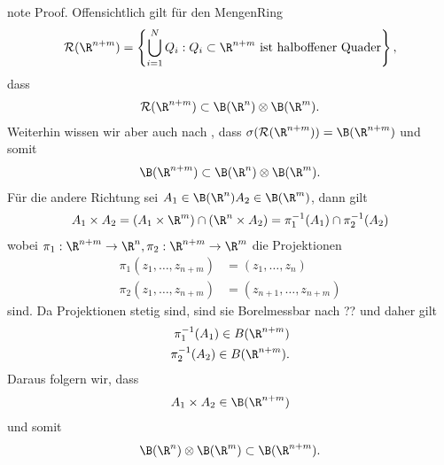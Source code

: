 \documentclass[letterpaper,10pt,german]{jupyterBook}
\begin{document}
\begin{sphinxadmonition}{note}
\sphinxAtStartPar
Proof. Offensichtlich gilt für den Mengen\sphinxhyphen{}Ring
\begin{equation*}
\begin{split}\mathcal{R}(\R^{n+m})=\left\{\bigcup_{i=1}^N Q_i: Q_i\subset\R^{n+m}\text{ ist halboffener Quader} \right\},\end{split}
\end{equation*}
\sphinxAtStartPar
dass
\begin{equation*}
\begin{split}\mathcal{R}(\R^{n+m})\subset \B(\R^n)\otimes \B(\R^m).\end{split}
\end{equation*}
\sphinxAtStartPar
Weiterhin wissen wir aber auch nach {\hyperref[\detokenize{masstheorie/masstheorie:s-gentop}]{}}, dass \(\sigma(\mathcal{R}(\R^{n+m})) = \B(\R^{n+m})\) und somit
\begin{equation*}
\begin{split}\B(\R^{n+m})\subset \B(\R^n)\otimes \B(\R^m).\end{split}
\end{equation*}
\sphinxAtStartPar
Für die andere Richtung sei \(A_1\in\B(\R^n) A_2\in\B(\R^m)\), dann gilt
\begin{equation*}
\begin{split}A_1\times A_2 = \left(A_1\times\R^m\right) \cap (\R^n\times A_2) =\pi_1^{-1}(A_1) \cap \pi_2^{-1}(A_2)\end{split}
\end{equation*}
\sphinxAtStartPar
wobei \(\pi_1:\R^{n+m}\to\R^n,\pi_2:\R^{n+m}\to\R^m\) die Projektionen
\begin{equation*}
\begin{split}\pi_1(z_1,\ldots,z_{n+m})&= (z_1,\ldots, z_n)\\
\pi_2(z_1,\ldots,z_{n+m})&= (z_{n+1},\ldots, z_{n+m})\end{split}
\end{equation*}
\sphinxAtStartPar
sind. Da Projektionen stetig sind, sind sie Borel\sphinxhyphen{}messbar nach ?? und daher gilt
\begin{equation*}
\begin{split}\pi_1^{-1}(A_1)\in B(\R^{n+m})\\
\pi_2^{-1}(A_2)\in B(\R^{n+m}).\end{split}
\end{equation*}
\sphinxAtStartPar
Daraus folgern wir, dass
\begin{equation*}
\begin{split}A_1\times A_2 \in \B(\R^{n+m})\end{split}
\end{equation*}
\sphinxAtStartPar
und somit
\begin{equation*}
\begin{split}\B(\R^n)\otimes \B(\R^m)\subset\B(\R^{n+m}).\end{split}
\end{equation*}\end{sphinxadmonition}
\end{document}
